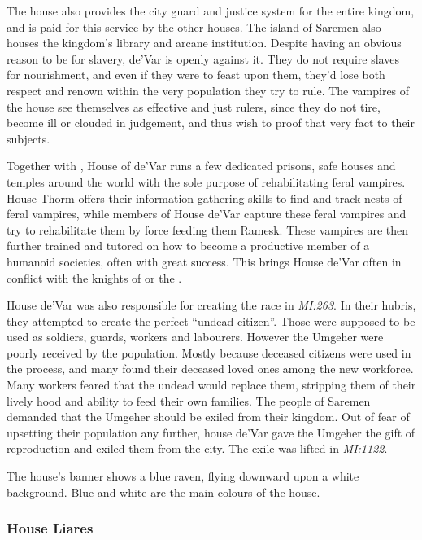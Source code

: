 The house also provides the city guard and justice system for the entire
kingdom, and is paid for this service by the other houses. The island of
Saremen also houses the kingdom's library and arcane institution. Despite
having an obvious reason to be for slavery, de'Var is openly against it. They
do not require slaves for nourishment, and even if they were to feast upon
them, they'd lose both respect and renown within the very population they try
to rule. The vampires of the house see themselves as effective and just
rulers, since they do not tire, become ill or clouded in judgement, and thus
wish to proof that very fact to their subjects.

Together with , House of de'Var runs a few dedicated
prisons, safe houses and temples around the world with the sole purpose of
rehabilitating feral vampires. House Thorm offers their information gathering
skills to find and track nests of feral vampires, while members of House
de'Var capture these feral vampires and try to rehabilitate them by force
feeding them Ramesk. These vampires are then further trained and tutored on
how to become a productive member of a humanoid societies, often with great
success. This brings House de'Var often in conflict with the knights of
 or the .

House de'Var was also responsible for creating the race 
in \emph{MI:263}. In their hubris, they attempted to create the perfect
``undead citizen''. Those were supposed to be used as soldiers, guards,
workers and labourers. However the Umgeher were poorly received by the
population. Mostly because deceased citizens were used in the process, and
many found their deceased loved ones among the new workforce. Many workers
feared that the undead would replace them, stripping them of their lively hood
and ability to feed their own families. The people of Saremen demanded that
the Umgeher should be exiled from their kingdom. Out of fear of upsetting
their population any further, house de'Var gave the Umgeher the gift of
reproduction and exiled them from the city. The exile was lifted in
\emph{MI:1122}.

The house's banner shows a blue raven, flying downward upon a white
background. Blue and white are the main colours of the house.

\subsubsection{House Liares}
\label{sec:House Liares}

